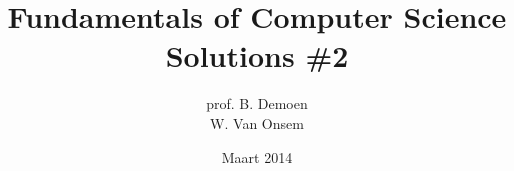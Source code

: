\documentclass{article}
\title{Fundamentals of Computer Science\\Solutions \#2}
\author{prof. B. Demoen\\W. Van Onsem}
\date{Maart 2014}
\begin{document}
\maketitle
\begin{exercise}
\end{exercise}
\end{document}
